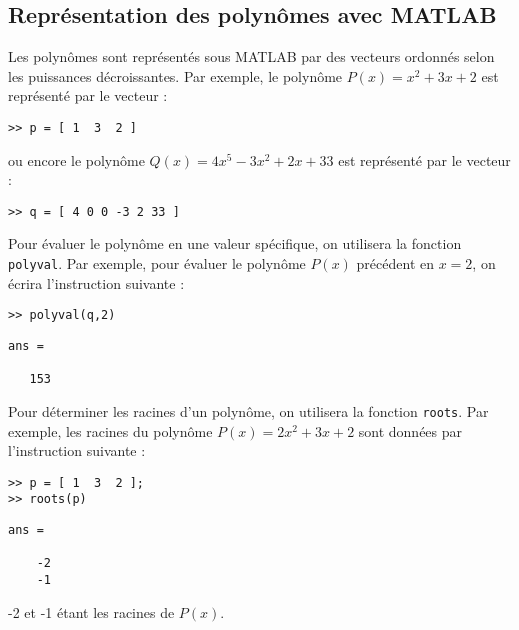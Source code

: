 \subsection{Représentation des polynômes avec MATLAB}
Les polynômes sont représentés sous MATLAB par des vecteurs ordonnés selon 
les puissances décroissantes.
Par exemple, le polynôme $P(x)=x^2+3x+2$ est représenté par le vecteur :
\begin{verbatim}
>> p = [ 1  3  2 ]
\end{verbatim}
ou encore le polynôme $Q(x)=4x^5−3x^2+2x+33$ est représenté par le vecteur :
\begin{verbatim}
>> q = [ 4 0 0 -3 2 33 ]
\end{verbatim}
Pour évaluer le polynôme en une valeur spécifique, on utilisera la fonction 
\texttt{polyval}. Par exemple, pour évaluer le polynôme $P(x)$ précédent en $x=2$,
on écrira l'instruction suivante :
\begin{verbatim}
>> polyval(q,2)
\end{verbatim}
\begin{verbatim}
ans =

   153
\end{verbatim}
Pour déterminer les racines d'un polynôme, on utilisera la fonction \texttt{roots}.
Par exemple, les racines du polynôme $P(x)=2x^2+3x+2$ sont données par l'instruction
suivante :
\begin{verbatim}
>> p = [ 1  3  2 ];
>> roots(p)
\end{verbatim}
\begin{verbatim}
ans =

    -2
    -1
\end{verbatim}
-2 et -1 étant les racines de $P(x)$.

